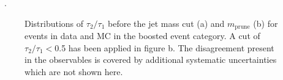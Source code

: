 ~\cite{Khachatryan:2014vla}.  \begin{figure}[hbtp]\begin{center} 
\caption{Distributions of $\tau_2/\tau_1$ before the jet mass cut (a) and
$m_{\mathrm{prune}}$ (b) for events in data and MC in the boosted event
category.  A cut of $\tau_2/\tau_1<$0.5 has been applied in figure b. The
disagreement present in the observables is covered by additional systematic
uncertainties which are not shown here.}
\label{fig:boostvtagvars}\end{center}\end{figure}

